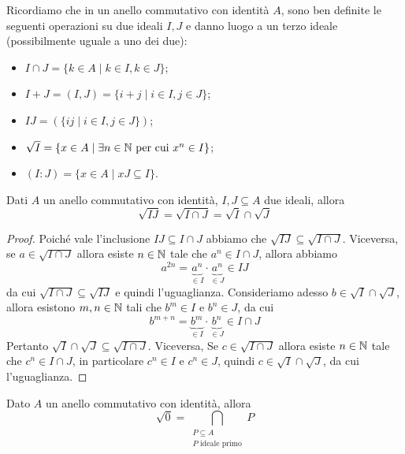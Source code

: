 \documentclass[11pt]{scrartcl}
\begin{document}
Ricordiamo che in un anello commutativo con identità $A$, sono ben definite
le seguenti operazioni su due ideali $I, J$ e danno luogo a un terzo ideale
(possibilmente uguale a uno dei due):
\begin{itemize}
    \item $I\cap J = \{k \in A \mid k \in I, k \in J\}$;
    \item $I + J = (I, J) = \{i + j \mid i \in I, j \in J\}$;
    \item $IJ = (\{ij\mid i \in I, j \in J\})$;
    \item $\sqrt{I} = \{x \in A \mid \exists n \in \mathbb N \text{ per cui } x^n \in I\}$;
    \item $(I : J) = \{x \in A \mid xJ \subseteq I\}$.
\end{itemize}

\begin{proposition}
    Dati $A$ un anello commutativo con identità, $I, J \subseteq A$ due ideali,
    allora
    \[
        \sqrt{IJ} = \sqrt{I\cap J} = \sqrt{I}\cap \sqrt{J}
    \]
\end{proposition}

\begin{proof}
    Poiché vale l'inclusione $IJ \subseteq I\cap J$ abbiamo che $\sqrt{IJ}
    \subseteq \sqrt{I\cap J}$. Viceversa, se $a \in \sqrt{I\cap J}$ allora
    esiste $n \in \mathbb N$ tale che $a^n \in I\cap J$, allora abbiamo 
    \[
        a^{2n} = \underset{\in I}{\underbrace{a^n}} \cdot \underset{\in J}{\underbrace{a^n}}
        \in IJ
    \]
    da cui $\sqrt{I\cap J} \subseteq \sqrt{IJ}$ e quindi l'uguaglianza.\newline
    Consideriamo adesso $b \in \sqrt{I}\cap \sqrt{J}$, allora esistono $m, n \in \mathbb N$
    tali che $b^m \in I$ e $b^n \in J$, da cui
    \[
        b^{m + n} = \underset{\in I}{\underbrace{b^m}}\cdot
        \underset{\in J}{\underbrace{b^n}} \in I\cap J
    \]
    Pertanto $\sqrt{I}\cap \sqrt{J} \subseteq \sqrt{I\cap J}$. Viceversa, Se
    $c \in \sqrt{I\cap J}$ allora esiste $n \in \mathbb N$ tale che $c^n \in I\cap J$, 
    in particolare $c^n \in I$ e $c^n \in J$, quindi $c \in \sqrt{I}\cap\sqrt{J}$,
    da cui l'uguaglianza.
\end{proof}

\begin{proposition}
    \label{prop2.9}
    Dato $A$ un anello commutativo con identità, allora
    \[
        \sqrt{0} = \bigcap_{\substack{P\subseteq A\\ P \text{ ideale primo}}}P
    \]
\end{proposition}
\end{document}
